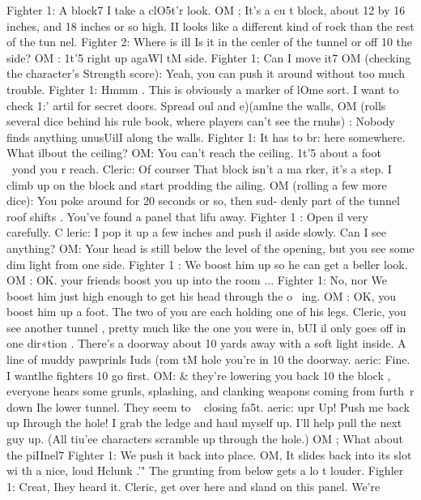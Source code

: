 \documentclass[../main.tex]{subfiles}
\begin{document}
\begin{multicols}{3}
		Fighter 1: A block7 I take a clO5t'r look.
		OM ; It's a cu t block, about 12 by 16 inches,
		and 18 inches or so high. II looks like a
		different kind of rock than the rest of the
		tun nel.
		Fighter 2: Where is ill Is it in the cenler of
		the tunnel or off 10 the side?
		OM : 1t'5 right up agaWl tM side.
		Fighter 1; Can I move it7
		OM (checking the character's Strength
		score): Yeah, you can push it around
		without too much trouble.
		Fighter 1: Hmmm . This is obviously a
		marker of lOme sort. I want to check 1:'\5
		artil for secret doors. Spread oul and
		e)(amlne the walls,
		OM (rolls several dice behind his rule book,
		where players can't see the rnuhs) :
		Nobody finds anything unusUilI along
		the walls.
		Fighter 1: It has to br: here somewhere.
		What ilbout the ceiling?
		OM: You can't reach the ceiling. 1t'5 about a
		foot ~yond you r reach.
		Cleric: Of courser That block isn't a ma rker,
		it's a step. I climb up on the block and
		start prodding the ailing.
		OM (rolling a few more dice): You poke
		around for 20 seconds or so, then sud-
		denly part of the tunnel roof shifts .
		You've found a panel that lifu away.
		Fighter 1 : Open il very carefully.
		C leric: I pop it up a few inches and push il
		aside slowly. Can I see anything?
		OM: Your head is still below the level of the
		opening, but you see some dim light
		from one side.
		Fighter 1 : We boost him up so he can get a
		beller look.
		OM : OK. your friends boost you up into the
		room ...
		Fighter 1: No, nor We boost him just high
		enough to get his head through the o~­
		ing.
		OM : OK, you boost him up a foot. The two
		of you are each holding one of his legs.
		Cleric, you see another tunnel , pretty
		much like the one you were in, bUI il
		only goes off in one dir«tion . There's a
		doorway about 10 yards away with a
		soft light inside. A line of muddy
		pawprinls Iuds (rom tM hole you're in
		10 the doorway.
		aeric: Fine. I wantlhe fighters 10 go first.
		OM: & they're lowering you back 10 the
		block , everyone hears some grunls,
		splashing, and clanking weapons coming
		from furth~r down Ihe lower tunnel.
		They seem to ~ closing fa5t.
		aeric: upr Up! Push me back up Ihrough
		the hole! I grab the ledge and haul myself
		up. I'll help pull the next guy up.
		(All tiu'ee characters scramble up through
		the hole.)
		OM ; What about the piIInel7
		Fighter 1: We push it back into place.
		OM, It slides back into its slot wi th a nice,
		loud Hclunk .'" The grunting from below
		gets a lo t louder.
		Fighler 1: Creat, Ihey heard it. Cleric, get
		over here and sland on this panel. We're

\end{multicols}
\end{document}
